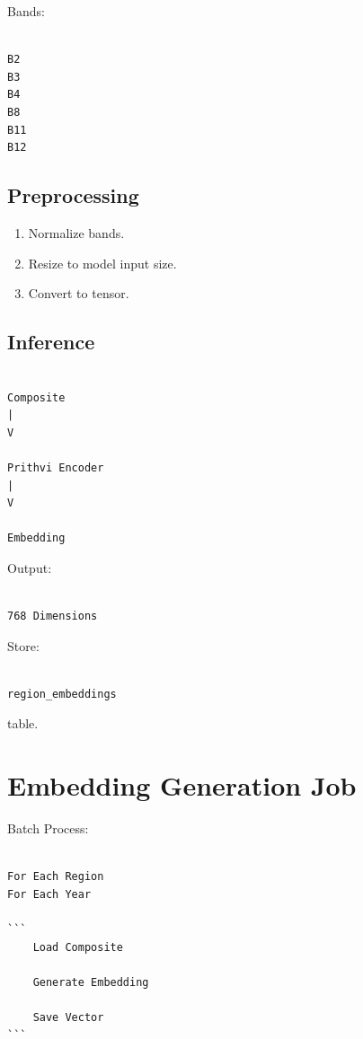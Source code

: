 \documentclass[11pt,a4paper]{article}
\begin{document}
Bands:

\begin{verbatim}

B2
B3
B4
B8
B11
B12

\end{verbatim}

\subsection{Preprocessing}

\begin{enumerate}
\item Normalize bands.
\item Resize to model input size.
\item Convert to tensor.
\end{enumerate}

\subsection{Inference}

\begin{verbatim}

Composite
|
V

Prithvi Encoder
|
V

Embedding

\end{verbatim}

Output:

\begin{verbatim}

768 Dimensions

\end{verbatim}

Store:

\begin{verbatim}

region_embeddings

\end{verbatim}

table.

\section{Embedding Generation Job}

Batch Process:

\begin{verbatim}

For Each Region
For Each Year

```
    Load Composite

    Generate Embedding

    Save Vector
```

\end{verbatim}
\end{document}
